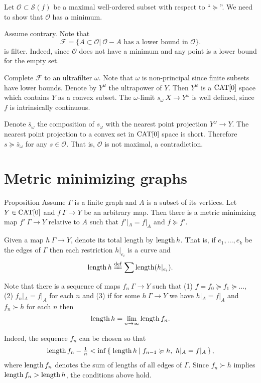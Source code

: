 \documentclass{article}
\begin{document}
Let $\mathcal{O}\subset\mathcal{S}(f)$ be a maximal well-ordered subset with respect to ``$\succcurlyeq$''. 
We need to show that $\mathcal{O}$ has a minimum.

Assume contrary.
Note that
$$
\mathcal{F}=\{A\subset\mathcal{O}|\ \mathcal{O}-A\text{ has a lower bound in }\mathcal{O}\}.
$$
is filter.
Indeed, since $\mathcal{O}$ does not have a minimum and any point is a lower bound for the empty set.

Complete $\mathcal{F}$ to an ultrafilter $\omega$. 
Note that $\omega$ is non-principal since finite subsets have lower bounds.
Denote by $Y^\omega$ the ultrapower of $Y$. 
Then $Y^\omega$
is a $\mathop{\rm CAT}\nolimits[0]$ space which contains $Y$ as a convex subset. 
The $\omega$-limit $s_\omega\:X\to Y^\omega$ is well defined, since
$f$ is intrinsically continuous. 

Denote $\bar s_\omega$ the composition of $s_\omega$ with the nearest point projection $Y^\omega\to Y$.
The nearest point projection to a convex set in $\mathop{\rm CAT}\nolimits[0]$ space is short.
Therefore $s\succcurlyeq \bar s_\omega$ for any $s\in \mathcal{O}$.
That is, $\mathcal{O}$ is not maximal, a contradiction.
\qeds


\section{Metric minimizing graphs}\label{Metric minimizing graphs}



\begin{thm}{Proposition}\label{prop:memigraph}
Assume $\Gamma$ is a  finite graph and $A$ is a subset of its vertices.
Let $Y\in\mathop{\rm CAT}\nolimits[0]$ and $f\:\Gamma\to Y$ be an arbitrary map.
Then there is a metric minimizing map $f'\:\Gamma\to Y$ relative to $A$ such that
$f'|_A=f|_A$ and 
$f\succcurlyeq f'$.
\end{thm} 

Given a map $h\:\Gamma\to Y$, denote its total length by $\mathop{\rm length}\nolimits h$.
That is, if $e_1,\dots,e_k$ be the edges of $\Gamma$ 
then each restriction $h|_{e_i}$ is a curve and
\[\length h
\df
\sum\length(h|_{e_i}).\]

Note that there is a sequence of maps $f_n\:\Gamma\to Y$
such that (1)
$f=f_0\succcurlyeq f_1\succcurlyeq\dots$, (2) $f_n|_A=f|_A$ for each $n$ and (3) if for some $h\:\Gamma\to Y$ we have $h|_A=f|_A$ and $f_n\succ h$ for each $n$ then 
\[\mathop{\rm length}\nolimits h=\lim_{n\to\infty}\mathop{\rm length}\nolimits f_n.\]

Indeed, the sequence $f_n$ can be chosen so that
\[\length f_n-\tfrac1n
<
\inf\set{\length h}{f_{n-1}\succcurlyeq h,\ h|_A=f|_A},\]
where $\mathop{\rm length}\nolimits f_n$ denotes the sum of lengths of all edges of $\Gamma$. %
Since $f_n\succ h$ implies $\mathop{\rm length}\nolimits f_n>\mathop{\rm length}\nolimits h$, 
the conditions above hold.
\end{document}
